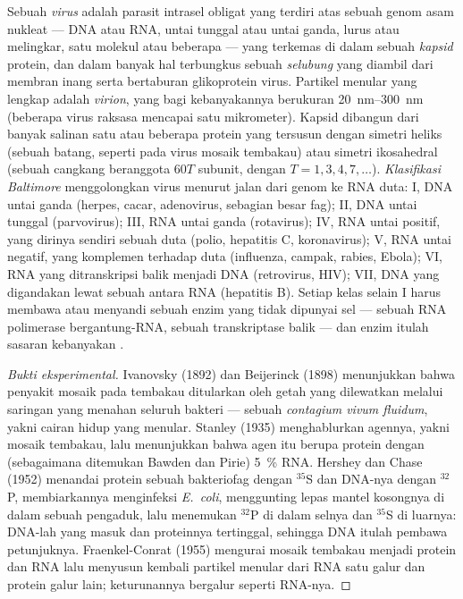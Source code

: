 \begin{definition}[Virus]\label{def:b3:virology:virus}
%
Sebuah \emph{virus} adalah parasit intrasel obligat yang terdiri atas sebuah
genom asam nukleat --- DNA atau RNA, untai tunggal atau untai ganda, lurus
atau melingkar, satu molekul atau beberapa --- yang terkemas di dalam sebuah
\emph{kapsid} protein, dan dalam banyak hal terbungkus sebuah \emph{selubung}
yang diambil dari membran inang serta bertaburan glikoprotein virus. Partikel
menular yang lengkap adalah \emph{virion}, yang bagi kebanyakannya berukuran
\qtyrange{20}{300}{nm} (beberapa virus raksasa mencapai satu mikrometer).
Kapsid dibangun dari banyak salinan satu atau beberapa protein yang tersusun
dengan simetri heliks (sebuah batang, seperti pada virus mosaik tembakau) atau
simetri ikosahedral (sebuah cangkang beranggota $60T$ subunit, dengan
$T = 1, 3, 4, 7,\dots$). \emph{Klasifikasi Baltimore} menggolongkan virus
menurut jalan dari genom ke RNA duta: I, DNA untai ganda (herpes, cacar,
adenovirus, sebagian besar fag); II, DNA untai tunggal (parvovirus); III, RNA
untai ganda (rotavirus); IV, RNA untai positif, yang dirinya sendiri sebuah
duta (polio, hepatitis C, koronavirus); V, RNA untai negatif, yang komplemen
terhadap duta (influenza, campak, rabies, Ebola); VI, RNA yang ditranskripsi
balik menjadi DNA (retrovirus, HIV); VII, DNA yang digandakan lewat sebuah
antara RNA (hepatitis B). Setiap kelas selain I harus membawa atau menyandi
sebuah enzim yang tidak dipunyai sel --- sebuah RNA polimerase bergantung-RNA,
sebuah transkriptase balik --- dan enzim itulah sasaran kebanyakan .
\end{definition}

\begin{proof}[Bukti eksperimental]
Ivanovsky (1892) dan Beijerinck (1898) menunjukkan bahwa penyakit mosaik pada
tembakau ditularkan oleh getah yang dilewatkan melalui saringan yang menahan
seluruh bakteri --- sebuah \emph{contagium vivum fluidum}, yakni cairan hidup
yang menular. Stanley (1935) menghablurkan agennya, yakni  mosaik
tembakau, lalu menunjukkan bahwa agen itu berupa protein dengan (sebagaimana
ditemukan Bawden dan Pirie) \qty{5}{\%} RNA. Hershey dan Chase (1952) menandai
protein sebuah bakteriofag dengan $^{35}$S dan DNA-nya dengan $^{32}$P,
membiarkannya menginfeksi \emph{E.~coli}, menggunting lepas mantel kosongnya
di dalam sebuah pengaduk, lalu menemukan $^{32}$P di dalam selnya dan $^{35}$S
di luarnya: DNA-lah yang masuk dan proteinnya tertinggal, sehingga DNA itulah
pembawa petunjuknya. Fraenkel-Conrat (1955) mengurai  mosaik tembakau
menjadi protein dan RNA lalu menyusun kembali partikel menular dari RNA satu
galur dan protein galur lain; keturunannya bergalur seperti RNA-nya.
\end{proof}


